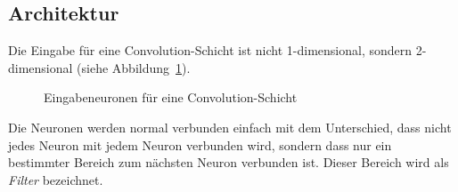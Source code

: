 \documentclass[12pt,a4paper]{report}
\begin{document}
\subsection{Architektur}
Die Eingabe für eine Convolution-Schicht ist nicht 1-dimensional, sondern 2-dimensional (siehe Abbildung~\ref{fig:conv1}).
\begin{figure}[h]
    \centering
{}
    \caption{Eingabeneuronen für eine Convolution-Schicht}
    \label{fig:conv1}
\end{figure}
Die Neuronen werden normal verbunden einfach mit dem Unterschied, dass nicht jedes Neuron mit jedem Neuron verbunden wird,
sondern dass nur ein bestimmter Bereich zum nächsten Neuron verbunden ist.
Dieser Bereich wird als \textit{Filter} bezeichnet.
\end{document}
